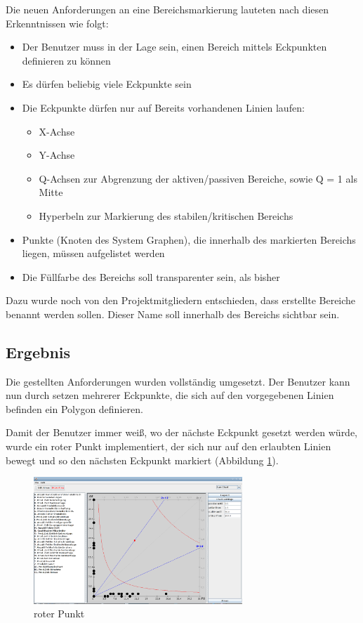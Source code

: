 Die neuen Anforderungen an eine Bereichsmarkierung lauteten nach diesen Erkenntnissen wie folgt:
\begin{itemize}
  \item Der Benutzer muss in der Lage sein, einen Bereich mittels Eckpunkten definieren zu können
  \item Es dürfen beliebig viele Eckpunkte sein
  \item Die Eckpunkte dürfen nur auf Bereits vorhandenen Linien laufen:
  \begin{itemize}
    \item X-Achse
    \item Y-Achse
    \item Q-Achsen zur Abgrenzung der aktiven/passiven Bereiche, sowie Q = 1 als Mitte
    \item Hyperbeln zur Markierung des stabilen/kritischen Bereichs
  \end{itemize}
  \item Punkte (Knoten des System Graphen), die innerhalb des markierten Bereichs liegen, müssen aufgelistet werden
  \item Die Füllfarbe des Bereichs soll transparenter sein, als bisher
\end{itemize}

Dazu wurde noch von den Projektmitgliedern entschieden, dass erstellte Bereiche benannt werden sollen. Dieser Name soll innerhalb des Bereichs sichtbar sein.

\subsection{Ergebnis}

Die gestellten Anforderungen wurden vollständig umgesetzt. Der Benutzer kann nun durch setzen mehrerer Eckpunkte, die sich auf den vorgegebenen Linien befinden ein Polygon definieren.

Damit der Benutzer immer weiß, wo der nächste Eckpunkt gesetzt werden würde, wurde ein roter Punkt implementiert, der sich nur auf den erlaubten Linien bewegt und so den nächsten Eckpunkt markiert (Abbildung \ref{roterPunkt}).
\begin{figure}[h]
	\centering
	\includegraphics[width=0.7\textwidth]{pictures/roter-punkt.png}
	\caption{roter Punkt}
	\label{roterPunkt}
\end{figure}

